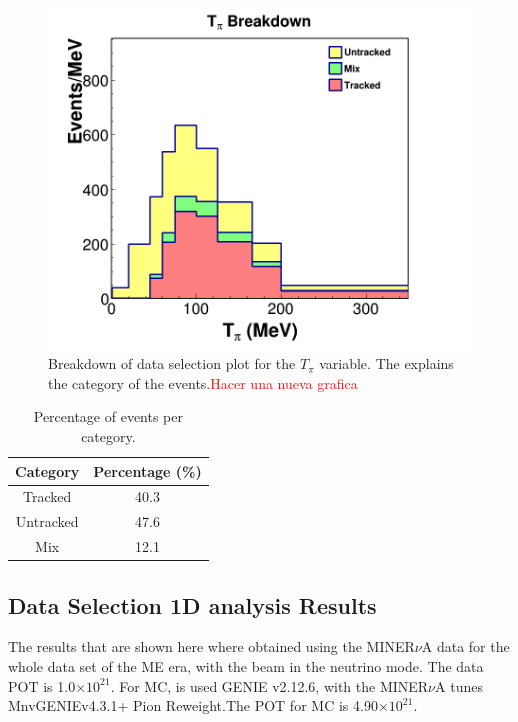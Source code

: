 \begin{figure}
    \centering
    \includegraphics[scale=0.35]{Figures/Chapter4/DataSelection/Stacked_Tpi.png}
    \caption{Breakdown of data selection plot for the $T_\pi$ variable. The explains the category of the events.\textcolor{red}{Hacer una nueva grafica}}
    \label{fig:Analysis:Cuts:DataSelBreakdown}
\end{figure}

\begin{table}[!htb]
    \centering
    \begin{tabular}{c|c}
         Category  & Percentage (\%) \\ \hline
         Tracked   &  40.3 \\
         Untracked &  47.6\\
         Mix       & 12.1
    \end{tabular}
    \caption{Percentage of events per category.}
    \label{tab:Analysis:Cuts:CategoryPercentage}
\end{table}

\subsection{Data Selection 1D analysis Results}
\label{Cap:Analysis:DataSelectionResults1D}

The results that are shown here where obtained using the MINER$\nu$A data for the whole data set of the ME era, with the beam in the neutrino mode. The data POT is 1.0$\times 10^{21}$. For MC, is used GENIE v2.12.6, with the MINER$\nu$A tunes MnvGENIEv4.3.1+ Pion Reweight.The POT for MC is 4.90$\times 10^{21}$.



